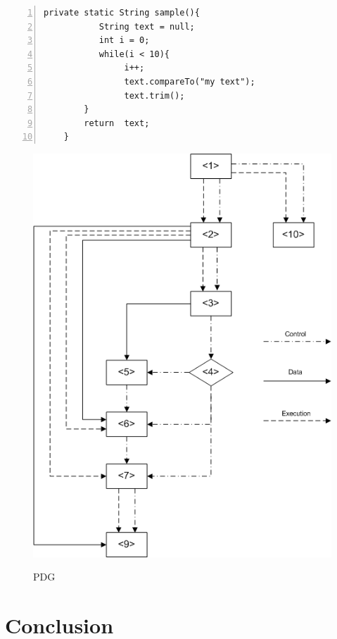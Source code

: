 \documentclass{report}
\begin{document}
\begin{lstlisting}[numbers=left, numbersep=-5pt]
    private static String sample(){
 		   String text = null;	
		   int i = 0;
		   while(i < 10){
				i++;
				text.compareTo("my text");
				text.trim();
		}
		return  text;
	} 
\end{lstlisting}

\begin{figure}[hb]
  \centering
  \includegraphics[scale=0.45]{Figures/exist-alg/pdg-example.png}\\[0.1cm]
  \caption[PDG]{PDG}
  \label{fig:pdg-ex}
\end{figure}


\chapter{Conclusion}
\label{cha:Conclusion}
\end{document}
